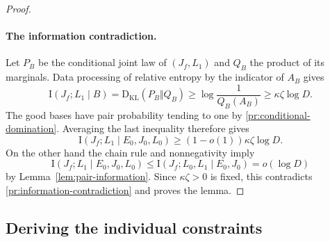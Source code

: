\begin{proof}
\paragraph{The information contradiction.}
Let $P_B$ be the conditional joint law of $(J_f,L_1)$ and $Q_B$
the product of its marginals. Data processing of relative entropy
by the indicator of $A_B$ gives
\[
 \mathrm I(J_f;L_1\mid B)
   =\mathrm D_{\mathrm{KL}}(P_B\Vert Q_B)
   \ge \log\frac1{Q_B(A_B)}
   \ge \kappa\zeta\log D.
\]
The good bases have pair probability tending to one by
\eqref{pr:conditional-domination}. Averaging the last inequality
therefore gives
\begin{equation}
 \mathrm I(J_f;L_1\mid E_0,J_0,L_0)
   \ge (1-o(1))\kappa\zeta\log D.
\label{pr:information-contradiction}
\end{equation}
On the other hand the chain rule and nonnegativity imply
\[
 \mathrm I(J_f;L_1\mid E_0,J_0,L_0)
 \le \mathrm I(J_f;L_0,L_1\mid E_0,J_0)
 =o(\log D)
\]
by Lemma~\ref{lem:pair-information}. Since $\kappa\zeta>0$
is fixed, this contradicts
\eqref{pr:information-contradiction} and proves the lemma.
\end{proof}

\subsection{Deriving the individual constraints}

